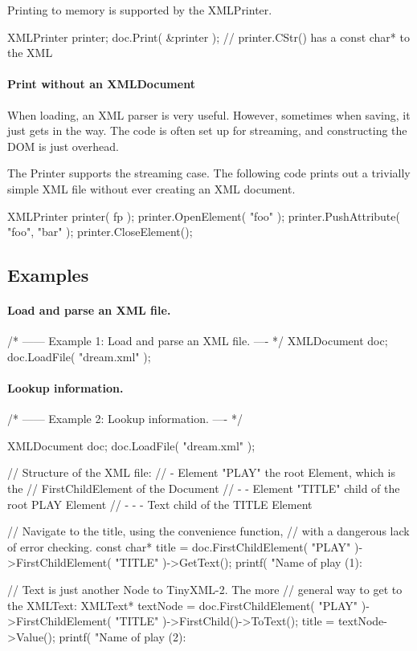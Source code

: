 Printing to memory is supported by the X\+M\+L\+Printer. \begin{DoxyVerb}XMLPrinter printer;
doc.Print( &printer );
// printer.CStr() has a const char* to the XML
\end{DoxyVerb}


\paragraph*{Print without an X\+M\+L\+Document}

When loading, an X\+ML parser is very useful. However, sometimes when saving, it just gets in the way. The code is often set up for streaming, and constructing the D\+OM is just overhead.

The Printer supports the streaming case. The following code prints out a trivially simple X\+ML file without ever creating an X\+ML document. \begin{DoxyVerb}XMLPrinter printer( fp );
printer.OpenElement( "foo" );
printer.PushAttribute( "foo", "bar" );
printer.CloseElement();
\end{DoxyVerb}


\subsection*{Examples }

\paragraph*{Load and parse an X\+ML file.}

\begin{DoxyVerb}/* ------ Example 1: Load and parse an XML file. ---- */
{
    XMLDocument doc;
    doc.LoadFile( "dream.xml" );
}
\end{DoxyVerb}


\paragraph*{Lookup information.}

\begin{DoxyVerb}/* ------ Example 2: Lookup information. ---- */
{
    XMLDocument doc;
    doc.LoadFile( "dream.xml" );

    // Structure of the XML file:
    // - Element "PLAY"      the root Element, which is the
    //                       FirstChildElement of the Document
    // - - Element "TITLE"   child of the root PLAY Element
    // - - - Text            child of the TITLE Element

    // Navigate to the title, using the convenience function,
    // with a dangerous lack of error checking.
    const char* title = doc.FirstChildElement( "PLAY" )->FirstChildElement( "TITLE" )->GetText();
    printf( "Name of play (1): %

    // Text is just another Node to TinyXML-2. The more
    // general way to get to the XMLText:
    XMLText* textNode = doc.FirstChildElement( "PLAY" )->FirstChildElement( "TITLE" )->FirstChild()->ToText();
    title = textNode->Value();
    printf( "Name of play (2): %
}
\end{DoxyVerb}


